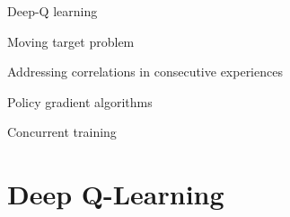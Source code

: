 

\leoslide

\subtitle{Deep Reinforcement Learning}


\maketitle

\introslide

\begin{frame}{\outline}

\blist
    \item Deep-Q learning
    \item Moving target problem
    \item Addressing correlations in consecutive experiences
    \item Policy gradient algorithms
    \item Concurrent training 
\elist
\end{frame}

\section{Deep Q-Learning}

